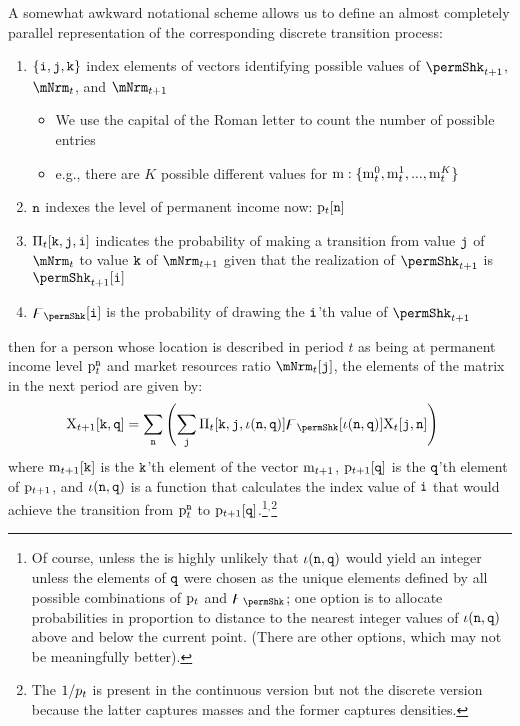 \documentclass[\econtexRoot/BufferStockTheory]{subfiles}
\begin{document}
\noindent A somewhat awkward notational scheme allows us to define an almost completely parallel representation of the corresponding discrete transition process:
\begin{enumerate}
\item $\{\texttt{i}, \texttt{j}, \texttt{k}\}$ index elements of vectors identifying possible values of $\permShkPrbNxt$, $\mNrmNow$, and $\mNrmNxt$
  \begin{itemize}
  \item We use the capital of the Roman letter to count the number of possible entries
    \item e.g., there are $K$ possible different values for $\mathrm{m}:\{\mathrm{m}_{t}^{0},\mathrm{m}_{t}^{1},...,\mathrm{m}_{t}^{K}\}$
    \end{itemize}
\item $\texttt{n}$ indexes the level of permanent income now: $\mathrm{p}_{t}[\texttt{n}]$
\item$\Pi_{t}[\texttt{k},\texttt{j},\texttt{i}]$ indicates the probability of making a transition from value $\texttt{j}$ of $\mNrmNow$ to value $\texttt{k}$ of $\mNrmNxt$ given that the realization of $\permShkPrbNxt$ is $\permShkPrbNxt[\nPermShk]$
\item $\permShkVec[\nPermShk]$ is the probability of drawing the $\texttt{i}$'th value of $\permShkPrbNxt$
\end{enumerate}
then for a person whose location is described in period $t$ as being at permanent income level $\mathrm{p}_{t}^{\texttt{n}}$ and market resources ratio $\mNrmNow[\nmNrmVecNow]$, the elements of the matrix in the next period are given by:
\begin{equation}\begin{aligned} \label{eq:mpMattp1}
  \mpMat_{t+1}[\nmNrmVecNxt,\npermLvlVecNxt] & = \sum_{\npermLvlVecNow} \left(\sum_{\nmNrmVecNow} \lomdkMat_{t}[\nmNrmVecNxt,\nmNrmVecNow,\nPermShkNxtFunc]\permShkVec[\nPermShkNxtFunc]\mpMat_{t}[\nmNrmVecNow,\npermLvlVecNow]  \right)
\end{aligned}\end{equation}
where $\mathrm{m}_{t+1}[\texttt{k}]$ is the $\texttt{k}$'th element of the vector $\mathrm{m}_{t+1}$, $\mathrm{p}_{t+1}[\texttt{q}]$ is the $\texttt{q}$'th element of $\mathrm{p}_{t+1}$, and $\iota(\texttt{n},\texttt{q})$ is a function that calculates the index value of $\texttt{i}$ that would achieve the transition from $\mathrm{p}_{t}^{\texttt{n}}$ to $\mathrm{p}_{t+1}[\texttt{q}]$.\footnote{Of course, unless the is highly unlikely that $\iota(\texttt{n},\texttt{q})$ would yield an integer unless the elements of $\texttt{q}$ were chosen as the unique elements defined by all possible combinations of $\mathrm{p}_{t}$ and $\permShkVec$; one option is to allocate probabilities in proportion to distance to the nearest integer values of $\iota(\texttt{n},\texttt{q})$ above and below the current point.
(There are other options, which may not be meaningfully better).}$^{,}$\footnote{The $1/p_{t}$ is present in the continuous version but not the discrete version because the latter captures masses and the former captures densities.}
\end{document}
